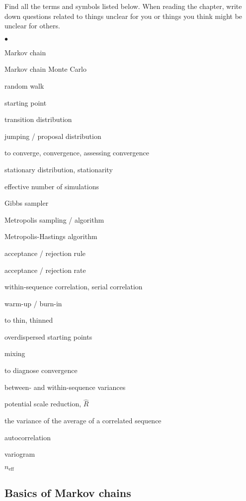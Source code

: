 \documentclass[a4paper,11pt,english]{article}
\begin{document}
Find all the terms and symbols listed below. When reading the chapter,
write down questions related to things unclear for you or things you
think might be unclear for others. 
\begin{list}{$\bullet$}{\parsep=0pt\itemsep=2pt}
\item Markov chain
\item Markov chain Monte Carlo
\item random walk
\item starting point
\item transition distribution
\item jumping / proposal distribution
\item to converge, convergence, assessing convergence
\item stationary distribution, stationarity
\item effective number of simulations
\item Gibbs sampler
\item Metropolis sampling / algorithm
\item Metropolis-Hastings algorithm
\item acceptance / rejection rule
\item acceptance / rejection rate
\item within-sequence correlation, serial correlation
\item warm-up / burn-in
\item to thin, thinned
\item overdispersed starting points
\item mixing
\item to diagnose convergence
\item between- and within-sequence variances
\item potential scale reduction, $\widehat{R}$
\item the variance of the average of a correlated sequence
\item autocorrelation
\item variogram
\item $n_{\mathrm{eff}}$
\end{list}

\subsection*{Basics of Markov chains}
\end{document}
